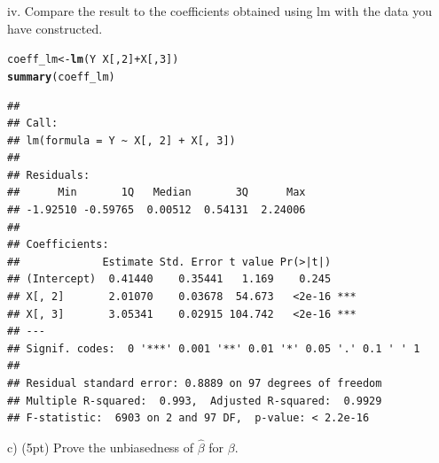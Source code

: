 \documentclass{article}\usepackage[]{graphicx}\usepackage[]{color}
\makeatletter
\newcommand{\hlnum}[1]{\textcolor[rgb]{0.686,0.059,0.569}{#1}}%
\newcommand{\hlopt}[1]{\textcolor[rgb]{0,0,0}{#1}}%
\newcommand{\hlstd}[1]{\textcolor[rgb]{0.345,0.345,0.345}{#1}}%
\newcommand{\hlkwb}[1]{\textcolor[rgb]{0.69,0.353,0.396}{#1}}%
\newcommand{\hlkwd}[1]{\textcolor[rgb]{0.737,0.353,0.396}{\textbf{#1}}}%
\newenvironment{kframe}{%
 \def\at@end@of@kframe{}%
 \ifinner\ifhmode%
  \def\at@end@of@kframe{\end{minipage}}%
  \begin{minipage}{\columnwidth}%
 \fi\fi%
 \def\FrameCommand##1{\hskip\@totalleftmargin \hskip-\fboxsep
 \colorbox{shadecolor}{##1}\hskip-\fboxsep
     \hskip-\linewidth \hskip-\@totalleftmargin \hskip\columnwidth}%
 \MakeFramed {\advance\hsize-\width
   \@totalleftmargin\z@ \linewidth\hsize
   \@setminipage}}%
 {\par\unskip\endMakeFramed%
 \at@end@of@kframe}
\newenvironment{knitrout}{}{} %
\makeatother
\begin{document}
iv. Compare the result to the coefficients obtained using lm with the data you have constructed.

\begin{knitrout}
\color{fgcolor}\begin{kframe}
\begin{alltt}
\hlstd{coeff_lm} \hlkwb{<-} \hlkwd{lm}\hlstd{(Y} \hlopt{~} \hlstd{X[,}\hlnum{2}\hlstd{]}\hlopt{+}\hlstd{X[,}\hlnum{3}\hlstd{])}
\hlkwd{summary}\hlstd{(coeff_lm)}
\end{alltt}
\begin{verbatim}
## 
## Call:
## lm(formula = Y ~ X[, 2] + X[, 3])
## 
## Residuals:
##      Min       1Q   Median       3Q      Max 
## -1.92510 -0.59765  0.00512  0.54131  2.24006 
## 
## Coefficients:
##             Estimate Std. Error t value Pr(>|t|)    
## (Intercept)  0.41440    0.35441   1.169    0.245    
## X[, 2]       2.01070    0.03678  54.673   <2e-16 ***
## X[, 3]       3.05341    0.02915 104.742   <2e-16 ***
## ---
## Signif. codes:  0 '***' 0.001 '**' 0.01 '*' 0.05 '.' 0.1 ' ' 1
## 
## Residual standard error: 0.8889 on 97 degrees of freedom
## Multiple R-squared:  0.993,	Adjusted R-squared:  0.9929 
## F-statistic:  6903 on 2 and 97 DF,  p-value: < 2.2e-16
\end{verbatim}
\end{kframe}
\end{knitrout}

c) (5pt) Prove the unbiasedness of $\hat{\beta}$ for $\beta$.

\vspace*{0.5cm}
% 
% 
% 
% 
% 
% 
\end{document}
